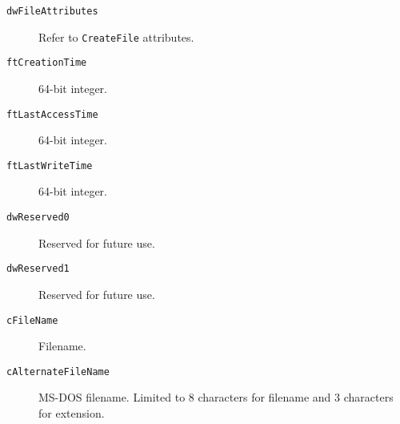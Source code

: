 \begin{description}
\item [\texttt{dwFileAttributes}] Refer to \texttt{CreateFile} attributes.
\item [\texttt{ftCreationTime}] 64-bit integer.
\item [\texttt{ftLastAccessTime}] 64-bit integer.
\item [\texttt{ftLastWriteTime}] 64-bit integer.
\item [\texttt{dwReserved0}] Reserved for future use.
\item [\texttt{dwReserved1}] Reserved for future use.
\item [\texttt{cFileName}] Filename.
\item [\texttt{cAlternateFileName}] MS-DOS filename. Limited to 8 characters for filename and 3 characters for extension.
\end{description}